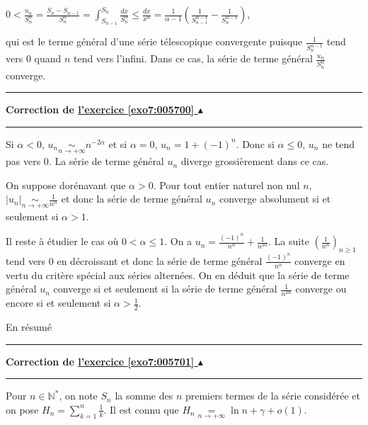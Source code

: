 \documentclass[11pt,a4paper]{article}
\newcommand{\Nn}{\mathbb{N}} \newcommand{\N}{\mathbb{N}}
\newcounter{exo}
\newcommand{\correction}[1]{\hypertarget{cor7:#1}{}\label{cor7:#1}{\bf Correction de \hyperlink{exo7:#1}{l'exercice \ref{exo7:#1} $\blacktriangle$}}\vspace{1mm}\hrule\vspace{1mm}}
\newcommand{\fincorrection}{\vspace{1mm}\hrule\vspace*{7mm}}
\begin{document}
\begin{center}
$0<\frac{u_n}{S_n^\alpha}=\frac{S_n-S_{n-1}}{S_n^\alpha}=\int_{S_{n-1}}^{S_n}\frac{dx}{S_n^\alpha}\leqslant\frac{dx}{x^\alpha}=\frac{1}{\alpha-1}\left(\frac{1}{S_{n-1}^{\alpha-1}}-\frac{1}{S_n^{\alpha-1}}\right)$,
\end{center}

qui est le terme général d'une série télescopique convergente puisque $\frac{1}{S_n^{\alpha-1}}$ tend vers $0$ quand $n$ tend vers l'infini. Dans ce cas, la série de terme général $\frac{u_n}{S_n^\alpha}$  converge.

\begin{center}
\end{center}
\fincorrection
\correction{005700}
Si $\alpha<0$, $u_n\underset{n\rightarrow+\infty}{\sim}n^{-2\alpha}$  et si $\alpha=0$, $u_n=1+(-1)^n$. Donc si $\alpha\leqslant0$, $u_n$ ne tend pas vers $0$. La série de terme général $u_n$ diverge grossièrement dans ce cas.

On suppose dorénavant que $\alpha> 0$. Pour tout entier naturel non nul $n$, $|u_n|\underset{n\rightarrow+\infty}{\sim}\frac{1}{n^\alpha}$ et donc la série de terme général $u_n$ converge absolument si et seulement si $\alpha> 1$.

Il reste à étudier le cas où $0 <\alpha\leqslant1$. On a $u_n=\frac{(-1)^n}{n^\alpha}+\frac{1}{n^{2\alpha}}$. La suite $\left(\frac{1}{n^\alpha}\right)_{n\geqslant1}$ tend vers $0$ en décroissant et donc la série de terme général $\frac{(-1)^n}{n^\alpha}$ converge en vertu du critère spécial aux séries alternées. On en déduit que la série de terme général $u_n$ converge si et seulement si la série de terme général $\frac{1}{n^{2\alpha}}$ converge ou encore si et seulement si $\alpha>\frac{1}{2}$.

En résumé

\begin{center}
\end{center}
\fincorrection
\correction{005701}
Pour $n\in\Nn^*$, on note $S_n$ la somme des $n$ premiers termes de la série considérée et on pose $H_n=\sum_{k=1}^{n}\frac{1}{k}$. Il est connu que $H_n\underset{n\rightarrow+\infty}{=}\ln n+\gamma+o(1)$.
\end{document}
